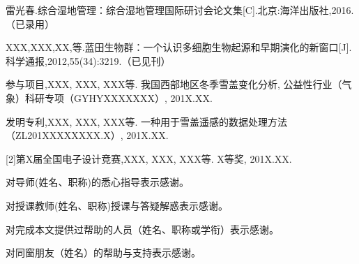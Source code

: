 \documentclass{cuitthesis}
\begin{document}
\cuitachievement
{}\par
雷光春.综合湿地管理：综合湿地管理国际研讨会论文集[C].北京:海洋出版社,2016.（已录用）

XXX,XXX,XX,等.蓝田生物群：一个认识多细胞生物起源和早期演化的新窗口[J].科学通报,2012,55(34):3219.（已见刊）

\par
[1]参与项目,XXX, XXX, XXX等. 我国西部地区冬季雪盖变化分析, 公益性行业（气象）科研专项（GYHYXXXXXXX）, 201X.XX.

\par
[1]发明专利,XXX, XXX, XXX等. 一种用于雪盖遥感的数据处理方法（ZL201XXXXXXXX.X）, 201X.XX.

[2]第X届全国电子设计竞赛,XXX, XXX, XXX等. X等奖, 201X.XX.

\cuitacknowledgement
对导师(姓名、职称)的悉心指导表示感谢。

对授课教师(姓名、职称)授课与答疑解惑表示感谢。

对完成本文提供过帮助的人员（姓名、职称或学衔）表示感谢。

对同窗朋友（姓名）的帮助与支持表示感谢。
\end{document}
